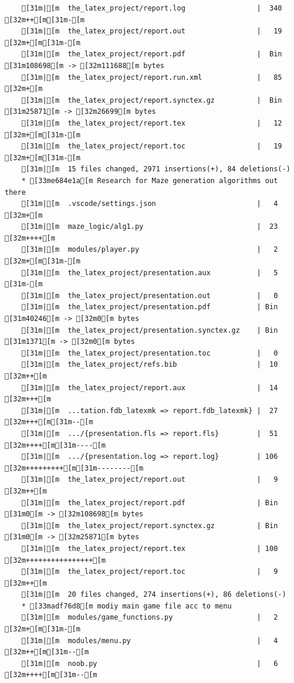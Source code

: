 \documentclass{article}
\begin{document}
{\begin{verbatim}
    [31m|[m  the_latex_project/report.log                 |  340 [32m++[m[31m-[m
    [31m|[m  the_latex_project/report.out                 |   19 [32m+[m[31m-[m
    [31m|[m  the_latex_project/report.pdf                 |  Bin [31m108698[m -> [32m111688[m bytes
    [31m|[m  the_latex_project/report.run.xml             |   85 [32m+[m
    [31m|[m  the_latex_project/report.synctex.gz          |  Bin [31m25871[m -> [32m26699[m bytes
    [31m|[m  the_latex_project/report.tex                 |   12 [32m+[m[31m-[m
    [31m|[m  the_latex_project/report.toc                 |   19 [32m+[m[31m-[m
    [31m|[m  15 files changed, 2971 insertions(+), 84 deletions(-)
    * [33me684e1a[m Research for Maze generation algorithms out there
    [31m|[m  .vscode/settings.json                        |   4 [32m+[m
    [31m|[m  maze_logic/alg1.py                           |  23 [32m++++[m
    [31m|[m  modules/player.py                            |   2 [32m+[m[31m-[m
    [31m|[m  the_latex_project/presentation.aux           |   5 [31m-[m
    [31m|[m  the_latex_project/presentation.out           |   0
    [31m|[m  the_latex_project/presentation.pdf           | Bin [31m40246[m -> [32m0[m bytes
    [31m|[m  the_latex_project/presentation.synctex.gz    | Bin [31m1371[m -> [32m0[m bytes
    [31m|[m  the_latex_project/presentation.toc           |   0
    [31m|[m  the_latex_project/refs.bib                   |  10 [32m++[m
    [31m|[m  the_latex_project/report.aux                 |  14 [32m+++[m
    [31m|[m  ...tation.fdb_latexmk => report.fdb_latexmk} |  27 [32m+++[m[31m--[m
    [31m|[m  .../{presentation.fls => report.fls}         |  51 [32m++++[m[31m----[m
    [31m|[m  .../{presentation.log => report.log}         | 106 [32m+++++++++[m[31m--------[m
    [31m|[m  the_latex_project/report.out                 |   9 [32m++[m
    [31m|[m  the_latex_project/report.pdf                 | Bin [31m0[m -> [32m108698[m bytes
    [31m|[m  the_latex_project/report.synctex.gz          | Bin [31m0[m -> [32m25871[m bytes
    [31m|[m  the_latex_project/report.tex                 | 100 [32m++++++++++++++++[m
    [31m|[m  the_latex_project/report.toc                 |   9 [32m++[m
    [31m|[m  20 files changed, 274 insertions(+), 86 deletions(-)
    * [33madf76d8[m modiy main game file acc to menu
    [31m|[m  modules/game_functions.py                    |   2 [32m+[m[31m-[m
    [31m|[m  modules/menu.py                              |   4 [32m++[m[31m--[m
    [31m|[m  noob.py                                      |   6 [32m++++[m[31m--[m

\end{verbatim}}
\end{document}
